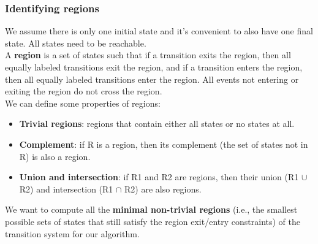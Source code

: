 \subsubsection*{Identifying regions}
We assume there is only one initial state and it's convenient to also have one final state. 
All states need to be reachable.
\\A \textbf{region} is a set of states such that if a transition exits the region, then all equally labeled transitions exit the region, and if a transition enters the region, then all equally labeled transitions enter the region.
All events not entering or exiting the region do not cross the region.
\\We can define some properties of regions:
\begin{itemize}
    \item \textbf{Trivial regions}: regions that contain either all states or no states at all.
    \item \textbf{Complement}: if R is a region, then its complement (the set of states not in R) is also a region.
    \item \textbf{Union and intersection}: if R1 and R2 are regions, then their union (R1 $\cup$ R2) and intersection (R1 $\cap$ R2) are also regions.
\end{itemize}
We want to compute all the \textbf{minimal non-trivial regions} (i.e., the smallest possible sets of states that still satisfy the region exit/entry constraints) of the transition system for our algorithm.

